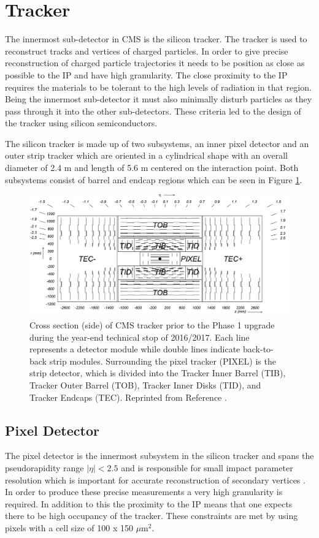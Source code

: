 \section{Tracker}
The innermost sub-detector in CMS is the silicon tracker.  The tracker is used to reconstruct tracks and vertices of charged particles.  In order to give precise reconstruction of charged particle trajectories it needs to be position as close as possible to the IP and have high granularity.  The close proximity to the IP requires the materials to be tolerant to the high levels of radiation in that region.  Being the innermost sub-detector it must also minimally disturb particles as they pass through it into the other sub-detectors.  These criteria led to the design of the tracker using silicon semiconductors.

The silicon tracker is made up of two subsystems, an inner pixel detector and an outer strip tracker which are oriented in a cylindrical shape with an overall diameter of 2.4 m and length of 5.6 m centered on the interaction point.  Both subsystems consist of barrel and endcap regions which can be seen in Figure \ref{fig:trackerlayoutv2}.  

\begin{figure}[h]
	\centering
	\includegraphics[width=0.7\linewidth]{Figures/TrackerLayout_v2}
	\caption{Cross section (side) of CMS tracker prior to the Phase 1 upgrade during the year-end technical stop of 2016/2017. Each line represents a detector module while double lines indicate back-to-back strip modules. Surrounding the pixel tracker (PIXEL) is the strip detector, which is divided into the Tracker Inner Barrel (TIB), Tracker Outer Barrel (TOB), Tracker Inner Disks (TID), and Tracker Endcaps (TEC). Reprinted from Reference \cite{Chatrchyan:1704291}.}
	\label{fig:trackerlayoutv2}
\end{figure}

\subsection{Pixel Detector}
The pixel detector is the innermost subsystem in the silicon tracker and spans the pseudorapidity range $|\eta|< 2.5$ and is responsible for small impact parameter resolution which is important for accurate reconstruction of secondary vertices \cite{Collaboration_2008}.  In order to produce these precise measurements a very high granularity is required.  In addition to this the proximity to the IP means that one expects there to be high occupancy of the tracker.  These constraints are met by using pixels with a cell size of 100 x 150 $\mu$m$^{2}$.  

